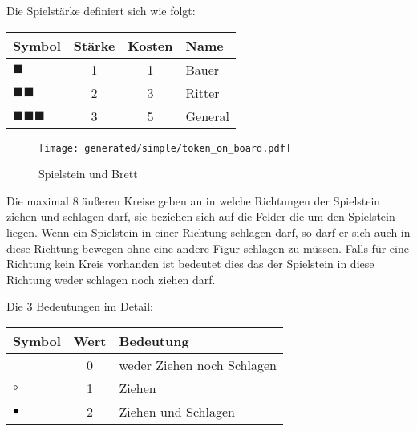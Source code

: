 \documentclass{article}
\begin{document}
	\begin{flushleft}
	Die Spielstärke definiert sich wie folgt:	
	
	\begin{tabular}{lccl}
	\hline
	Symbol 									& Stärke & Kosten & Name \\ \hline 
	$\blacksquare$ 							& 1 & 1 & Bauer \\ 
	$\blacksquare\blacksquare$ 				& 2 & 3 & Ritter \\ 
	$\blacksquare\blacksquare\blacksquare$  & 3 & 5 & General \\ 
	\end{tabular}
	\end{flushleft}
	
	
	\begin{wrapfigure}{r}{6.2cm}
  	\texttt{[image: generated/simple/token\_on\_board.pdf]}
  	\caption{Spielstein und Brett}
	\end{wrapfigure}
	
	Die maximal 8 äußeren Kreise geben an in welche Richtungen der Spielstein ziehen und 
	schlagen darf, sie beziehen sich auf die Felder die um den Spielstein liegen.
	Wenn ein Spielstein in einer Richtung schlagen darf, so darf er sich auch in 
	diese Richtung bewegen ohne eine andere Figur schlagen zu müssen. Falls für eine
	Richtung kein Kreis vorhanden ist bedeutet dies das der Spielstein in diese Richtung
	weder schlagen noch ziehen darf. 
	
	
	
	\vspace{0.2cm}
	
	\begin{flushleft}
	Die 3 Bedeutungen im Detail: 
	\end{flushleft}
	
	\vspace{0.2cm}
	
	\begin{tabular}{lcl}
	\hline
	Symbol & Wert & Bedeutung  \\  \hline
									& 0 & weder Ziehen noch Schlagen \\
	\textcolor{black}{$\circ$}		& 1 & Ziehen \\ 
	\textcolor{black}{$\bullet$} 	& 2 & Ziehen und Schlagen  \\ 
	\end{tabular}
	 
	\vspace{0.3cm}
    
\end{document}

